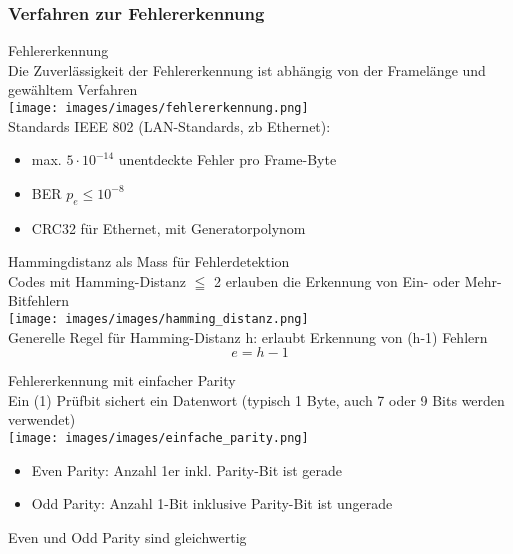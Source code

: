 \columnbreak

\subsubsection{Verfahren zur Fehlererkennung}

\begin{concept}{Fehlererkennung}\\
    Die Zuverlässigkeit der Fehlererkennung ist abhängig von der Framelänge und gewähltem Verfahren\\
    \texttt{[image: images/images/fehlererkennung.png]}\\
    Standards IEEE 802 (LAN-Standards, zb Ethernet):
    \begin{itemize}
        \item max. $5 \cdot 10^{-14}$ unentdeckte Fehler pro Frame-Byte
        \item BER $p_e \leq 10^{-8}$
        \item CRC32 für Ethernet, mit Generatorpolynom
    \end{itemize}
\end{concept}



\begin{concept}{Hammingdistanz als Mass für Fehlerdetektion}\\
    Codes mit Hamming-Distanz $\leqq$ 2 erlauben die Erkennung von Ein- oder Mehr-Bitfehlern \\
        \texttt{[image: images/images/hamming\_distanz.png]}\\
    Generelle Regel für Hamming-Distanz h: erlaubt Erkennung von (h-1) Fehlern 
    $$e = h - 1$$
\end{concept}

\begin{concept}{Fehlererkennung mit einfacher Parity}\\
    Ein (1) Prüfbit sichert ein Datenwort (typisch 1 Byte, auch 7 oder 9 Bits werden verwendet)\\
        \texttt{[image: images/images/einfache\_parity.png]}
\begin{itemize}
    \item Even Parity: Anzahl 1er inkl. Parity-Bit ist gerade
    \item Odd Parity: Anzahl 1-Bit inklusive Parity-Bit ist ungerade
\end{itemize}
Even und Odd Parity sind gleichwertig
\end{concept}

